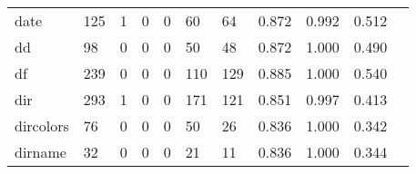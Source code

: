\begin{longtable}{lp{1.2cm}p{1.2cm}p{1.2cm}p{1.2cm}p{1.2cm}p{1.2cm}p{1.2cm}p{1.2cm}p{1.2cm}p{1.2cm}}
date      &                                   125 &                                                  1 &                                                  0 &                                                  0 &                                                 60 &                                                 64 &                                              0.872 &                                              0.992 &                                              0.512 \\
dd        &                                    98 &                                                  0 &                                                  0 &                                                  0 &                                                 50 &                                                 48 &                                              0.872 &                                              1.000 &                                              0.490 \\
df        &                                   239 &                                                  0 &                                                  0 &                                                  0 &                                                110 &                                                129 &                                              0.885 &                                              1.000 &                                              0.540 \\
dir       &                                   293 &                                                  1 &                                                  0 &                                                  0 &                                                171 &                                                121 &                                              0.851 &                                              0.997 &                                              0.413 \\
dircolors &                                    76 &                                                  0 &                                                  0 &                                                  0 &                                                 50 &                                                 26 &                                              0.836 &                                              1.000 &                                              0.342 \\
dirname   &                                    32 &                                                  0 &                                                  0 &                                                  0 &                                                 21 &                                                 11 &                                              0.836 &                                              1.000 &                                              0.344 \\

\end{longtable}
